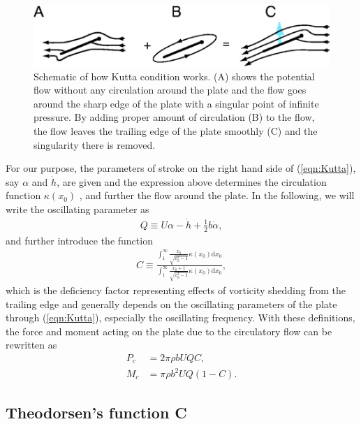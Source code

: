 \begin{figure}
\begin{center}
 \includegraphics[width=14cm]{Figures/theodorsen/KuttaCondition.png}
\end{center}
\caption[Schematic of Kutta condition]{Schematic of how Kutta condition works. (A) shows the potential flow without any circulation around the plate and the flow goes around the sharp edge of the plate with a singular point of infinite pressure. By adding proper amount of circulation (B) to the flow, the flow leaves the trailing edge of the plate smoothly (C) and the singularity there is removed.}
\label{fig:KuttaCondition}
\end{figure}

For our purpose, the parameters of stroke on the right hand side of (\eqref{eqn:Kutta}), say $\alpha$ and $\dot{h}$, are given and the expression above determines the circulation function $\kappa(x_0)$ , and further the flow around the plate. 
In the following, we will write the oscillating parameter as
\begin{align}
Q \equiv U \alpha - \dot{h} + \frac{1}{2}b\dot{\alpha},
\end{align}
and further introduce the function
\begin{align}
C \equiv \frac{\int_{1}^{\infty} \frac{x_0}{\sqrt{x_0^2-1}} \kappa(x_0) \mathrm{d}x_0}{\int_{1}^{\infty} \frac{x_0+1}{\sqrt{x_0^2-1}} \kappa(x_0) \mathrm{d}x_0},
\end{align}
which is the deficiency factor representing effects of vorticity shedding from the trailing edge and generally depends on the oscillating parameters of the plate through (\ref{eqn:Kutta}), especially the oscillating frequency.
With these definitions, the force and moment acting on the plate due to the circulatory flow can be rewritten as
\begin{align}
P_c & = 2\pi \rho b U Q C,  \\
M_c & = \pi \rho b^2 U Q (1 - C).
\end{align}

\subsection{Theodorsen's function C}

